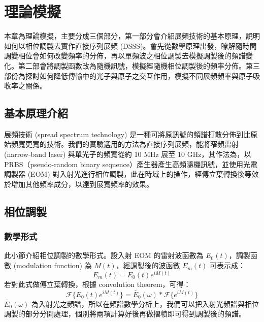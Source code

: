 \documentclass[class=NCU_thesis, crop=false]{standalone}
\begin{document}
\chapter{理論模擬}
本章為理論模擬，主要分成三個部分，第一部分會介紹展頻技術的基本原理，說明如何以相位調製去實作直接序列展頻 (DSSS)。會先從數學原理出發，瞭解隨時間調變相位會如何改變頻率的分佈，再以單頻波之相位調製去模擬調製後的頻譜變化。第二部會將調製函數改為隨機訊號，模擬經隨機相位調製後的頻率分佈。第三部份為探討如何降低傳輸中的光子與原子之交互作用，模擬不同展頻頻率與原子吸收率之關係。


\section{基本原理介紹}
展頻技術 (spread spectrum technology) 是一種可將原訊號的頻譜打散分佈到比原始頻寬更寬的技術。我們的實驗選用的方法為直接序列展頻，能將窄頻雷射 (narrow-band laser) 與單光子的頻寬從約 10 MHz 展至 10 GHz，其作法為，以 PRBS（pseudo-random binary sequence）產生器產生高頻隨機訊號，並使用光電調製器 (EOM) 對入射光進行相位調製，此在時域上的操作，經傅立葉轉換後等效於增加其他頻率成分，以達到展寬頻率的效果。

\section{相位調製}

\subsection{數學形式}
此小節介紹相位調製的數學形式。設入射 EOM 的雷射波函數為 $E_{0}(t)$，調製函數 (modulation function) 為 $M(t)$，經調製後的波函數 $E_{m}(t)$ 可表示成：
\begin{equation}
    E_{m}(t)=E_{0}(t)e^{iM(t)}
\end{equation}
若對此式做傅立葉轉換，根據 convolution theorem，可得：
\begin{equation}
\label{eq:modulation_function}
    \mathscr{F}\{E_{0}(t)e^{iM(t)}\}=\tilde{E_{0}}(\omega)*\mathscr{F}\{{e^{iM(t)}}\}
\end{equation}
$\tilde{E_{0}}(\omega)$ 為入射光之頻譜，所以在頻譜數學分析上，我們可以把入射光頻譜與相位調製的部分分開處理，個別將兩項計算好後再做摺積即可得到調製後的頻譜。
\end{document}
